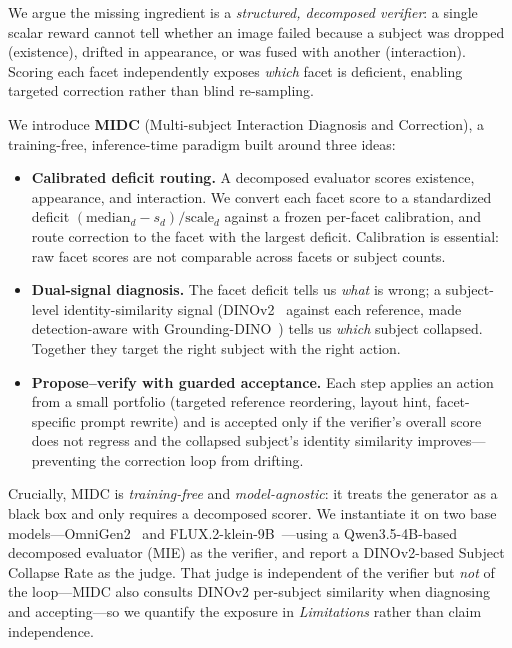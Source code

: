 \documentclass[letterpaper]{article}
\begin{document}
We argue the missing ingredient is a \emph{structured, decomposed verifier}: a single scalar reward cannot tell whether an image failed because a subject was dropped (existence), drifted in appearance, or was fused with another (interaction). Scoring each facet independently exposes \emph{which} facet is deficient, enabling targeted correction rather than blind re-sampling.

We introduce \textbf{MIDC} (Multi-subject Interaction Diagnosis and Correction), a training-free, inference-time paradigm built around three ideas:
\begin{itemize}
\item \textbf{Calibrated deficit routing.} A decomposed evaluator scores existence, appearance, and interaction. We convert each facet score to a standardized deficit $(\mathrm{median}_d - s_d)/\mathrm{scale}_d$ against a frozen per-facet calibration, and route correction to the facet with the largest deficit. Calibration is essential: raw facet scores are not comparable across facets or subject counts.
\item \textbf{Dual-signal diagnosis.} The facet deficit tells us \emph{what} is wrong; a subject-level identity-similarity signal (DINOv2~\citep{oquab2023dinov2} against each reference, made detection-aware with Grounding-DINO~\citep{liu2023grounding}) tells us \emph{which} subject collapsed. Together they target the right subject with the right action.
\item \textbf{Propose--verify with guarded acceptance.} Each step applies an action from a small portfolio (targeted reference reordering, layout hint, facet-specific prompt rewrite) and is accepted only if the verifier's overall score does not regress and the collapsed subject's identity similarity improves---preventing the correction loop from drifting.
\end{itemize}

Crucially, MIDC is \emph{training-free} and \emph{model-agnostic}: it treats the generator as a black box and only requires a decomposed scorer. We instantiate it on two base models---OmniGen2~\citep{wu2025omnigen2} and FLUX.2-klein-9B~\citep{blackforest2025flux2}---using a Qwen3.5-4B-based decomposed evaluator (MIE) as the verifier, and report a DINOv2-based Subject Collapse Rate as the judge. That judge is independent of the verifier but \emph{not} of the loop---MIDC also consults DINOv2 per-subject similarity when diagnosing and accepting---so we quantify the exposure in \emph{Limitations} rather than claim independence.
\end{document}
